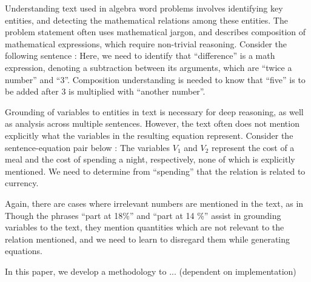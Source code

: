   Understanding text used in algebra word problems involves
  identifying key entities, and detecting the mathematical relations
  among these entities. The problem statement often uses mathematical
  jargon, and describes composition of mathematical expressions, which
  require non-trivial reasoning. Consider the following sentence :
  \noindent
  Here, we need to identify that ``difference'' is a math expression,
  denoting a subtraction between its arguments, which are ``twice a
  number'' and ``3''. Composition understanding is needed to know that
  ``five'' is to be added after $3$ is multiplied with ``another
  number''.

  Grounding of variables to entities in text is necessary for deep
  reasoning, as well as analysis across multiple sentences. However,
  the text often does not mention explicitly what the variables in the
  resulting equation represent. Consider the sentence-equation pair
  below :
  \noindent
  The variables $V_1$ and $V_2$ represent the cost of a meal and the
  cost of spending a night, respectively, none of which is explicitly
  mentioned. We need to determine from ``spending'' that the relation
  is related to currency.

  Again, there are cases where irrelevant numbers are mentioned in the
  text, as in
  \noindent
  Though the phrases ``part at 18\%'' and ``part at 14 \%'' assist in
  grounding variables to the text, they mention quantities which are
  not relevant to the relation mentioned, and we need to learn to
  disregard them while generating equations.

  In this paper, we develop a methodology to ... (dependent on
  implementation)
